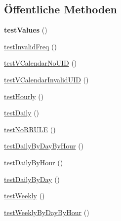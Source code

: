 \subsection*{Öffentliche Methoden}
\begin{DoxyCompactItemize}
\item 
\mbox{\label{class_sabre_1_1_v_object_1_1_recur_1_1_event_iterator_1_1_main_test_a0545ba65a09f9fb552da13c2fcd800f8}} 
{\bfseries test\+Values} ()
\item 
\mbox{\hyperlink{class_sabre_1_1_v_object_1_1_recur_1_1_event_iterator_1_1_main_test_a747862802d96978a3f91bfc4794550bf}{test\+Invalid\+Freq}} ()
\item 
\mbox{\hyperlink{class_sabre_1_1_v_object_1_1_recur_1_1_event_iterator_1_1_main_test_a1528c93baff8b40085c5221d15f4f02e}{test\+V\+Calendar\+No\+U\+ID}} ()
\item 
\mbox{\hyperlink{class_sabre_1_1_v_object_1_1_recur_1_1_event_iterator_1_1_main_test_a554d34fccb79fcd3fd13e55357d4ef15}{test\+V\+Calendar\+Invalid\+U\+ID}} ()
\item 
\mbox{\hyperlink{class_sabre_1_1_v_object_1_1_recur_1_1_event_iterator_1_1_main_test_a2d8056546460e0cf88dd87df1c363fbd}{test\+Hourly}} ()
\item 
\mbox{\hyperlink{class_sabre_1_1_v_object_1_1_recur_1_1_event_iterator_1_1_main_test_a2c23c19e181ec43af7143722b5b15a10}{test\+Daily}} ()
\item 
\mbox{\hyperlink{class_sabre_1_1_v_object_1_1_recur_1_1_event_iterator_1_1_main_test_a5b1c46eee3f077800aa70b26863df06a}{test\+No\+R\+R\+U\+LE}} ()
\item 
\mbox{\hyperlink{class_sabre_1_1_v_object_1_1_recur_1_1_event_iterator_1_1_main_test_adaeae92e3f6206f1364097c995959e27}{test\+Daily\+By\+Day\+By\+Hour}} ()
\item 
\mbox{\hyperlink{class_sabre_1_1_v_object_1_1_recur_1_1_event_iterator_1_1_main_test_a3b004c47927aad1fb5159ba23c675275}{test\+Daily\+By\+Hour}} ()
\item 
\mbox{\hyperlink{class_sabre_1_1_v_object_1_1_recur_1_1_event_iterator_1_1_main_test_afd79b18c887add01209200795d50d821}{test\+Daily\+By\+Day}} ()
\item 
\mbox{\hyperlink{class_sabre_1_1_v_object_1_1_recur_1_1_event_iterator_1_1_main_test_a7dba8e5f320023eb2a18a67bad1dddfc}{test\+Weekly}} ()
\item 
\mbox{\hyperlink{class_sabre_1_1_v_object_1_1_recur_1_1_event_iterator_1_1_main_test_a9b2bd718333aa55a72d240a94329c17d}{test\+Weekly\+By\+Day\+By\+Hour}} ()

\end{DoxyCompactItemize}
